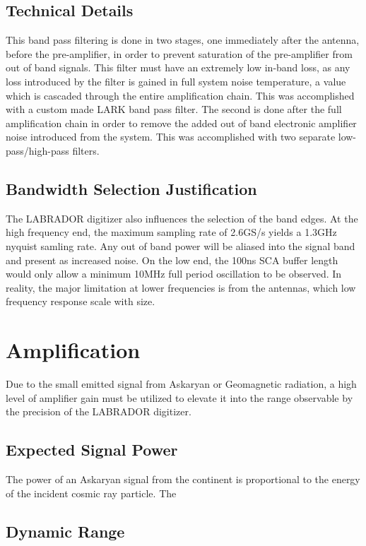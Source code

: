 	\subsection{Technical Details}
		This band pass filtering is done in two stages, one immediately after the antenna, before the pre-amplifier, in order to prevent saturation of the pre-amplifier from out of band signals.  This filter must have an extremely low in-band loss, as any loss introduced by the filter is gained in full system noise temperature, a value which is cascaded through the entire amplification chain.  This was accomplished with a custom made LARK band pass filter.  The second is done after the full amplification chain in order to remove the added out of band electronic amplifier noise introduced from the system.  This was accomplished with two separate low-pass/high-pass filters.
	\subsection{Bandwidth Selection Justification}	
		The LABRADOR digitizer also influences the selection of the band edges.  At the high frequency end, the maximum sampling rate of 2.6GS/s yields a 1.3GHz nyquist samling rate.  Any out of band power will be aliased into the signal band and present as increased noise.  On the low end, the 100ns SCA buffer length would only allow a minimum 10MHz full period oscillation to be observed.  In reality, the major limitation at lower frequencies is from the antennas, which low frequency response scale with size.
		
\section{Amplification}
	Due to the small emitted signal from Askaryan or Geomagnetic radiation, a high level of amplifier gain must be utilized to elevate it into the range observable by the precision of the LABRADOR digitizer.
	\subsection{Expected Signal Power}
		The power of an Askaryan signal from the continent is proportional to the energy of the incident cosmic ray particle.  The 

	\subsection{Dynamic Range}
		
